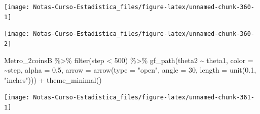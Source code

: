 \documentclass[
  12pt,
]{book}
\newenvironment{Shaded}{\begin{snugshade}}{\end{snugshade}}
\newcommand{\AttributeTok}[1]{\textcolor[rgb]{0.77,0.63,0.00}{#1}}
\newcommand{\DecValTok}[1]{\textcolor[rgb]{0.00,0.00,0.81}{#1}}
\newcommand{\FloatTok}[1]{\textcolor[rgb]{0.00,0.00,0.81}{#1}}
\newcommand{\FunctionTok}[1]{\textcolor[rgb]{0.00,0.00,0.00}{#1}}
\newcommand{\NormalTok}[1]{#1}
\newcommand{\SpecialCharTok}[1]{\textcolor[rgb]{0.00,0.00,0.00}{#1}}
\newcommand{\StringTok}[1]{\textcolor[rgb]{0.31,0.60,0.02}{#1}}
\theoremstyle{definition}
\theoremstyle{definition}
\theoremstyle{definition}
\theoremstyle{definition}
\theoremstyle{remark}
\begin{document}
\begin{center}\texttt{[image: Notas-Curso-Estadistica\_files/figure-latex/unnamed-chunk-360-1]} \end{center}

\begin{Shaded}
\end{Shaded}

\begin{center}\texttt{[image: Notas-Curso-Estadistica\_files/figure-latex/unnamed-chunk-360-2]} \end{center}

\begin{Shaded}
\begin{Highlighting}[]
\NormalTok{Metro\_2coinsB }\SpecialCharTok{\%\textgreater{}\%}
    \FunctionTok{filter}\NormalTok{(step }\SpecialCharTok{\textless{}} \DecValTok{500}\NormalTok{) }\SpecialCharTok{\%\textgreater{}\%}
    \FunctionTok{gf\_path}\NormalTok{(theta2 }\SpecialCharTok{\textasciitilde{}}\NormalTok{ theta1, }\AttributeTok{color =} \SpecialCharTok{\textasciitilde{}}\NormalTok{step, }\AttributeTok{alpha =} \FloatTok{0.5}\NormalTok{,}
        \AttributeTok{arrow =} \FunctionTok{arrow}\NormalTok{(}\AttributeTok{type =} \StringTok{"open"}\NormalTok{, }\AttributeTok{angle =} \DecValTok{30}\NormalTok{, }\AttributeTok{length =} \FunctionTok{unit}\NormalTok{(}\FloatTok{0.1}\NormalTok{,}
            \StringTok{"inches"}\NormalTok{))) }\SpecialCharTok{+} \FunctionTok{theme\_minimal}\NormalTok{()}
\end{Highlighting}
\end{Shaded}

\begin{center}\texttt{[image: Notas-Curso-Estadistica\_files/figure-latex/unnamed-chunk-361-1]} \end{center}
\end{document}
